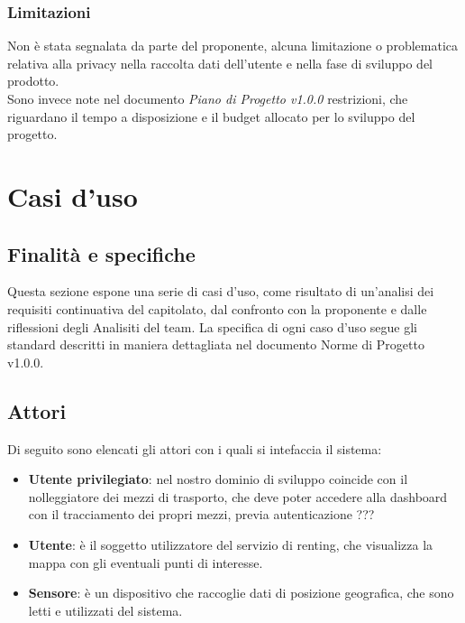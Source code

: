 \documentclass[11pt]{article}
\begin{document}
\begin{justify}
\subsubsection{Limitazioni}
Non è stata segnalata da parte del proponente, alcuna limitazione o problematica relativa alla privacy nella raccolta dati dell'utente e nella fase di sviluppo del prodotto.
\\
Sono invece note nel documento \textit{Piano di Progetto v1.0.0} restrizioni, che riguardano il tempo a disposizione e il budget allocato per lo sviluppo del progetto. 
\newpage
\section{Casi d'uso}
\label{sec:casi-uso}

\subsection{Finalità e specifiche}
Questa sezione espone una serie di casi d'uso, come risultato di un'analisi dei requisiti continuativa del capitolato, dal confronto con la proponente e dalle riflessioni degli Analisiti del team. La specifica di ogni caso d'uso segue gli standard descritti in maniera dettagliata nel documento Norme di Progetto v1.0.0.

\subsection{Attori}
Di seguito sono elencati gli attori con i quali si intefaccia il sistema:
\begin{itemize}
    \item \textbf{Utente privilegiato}: nel nostro dominio di sviluppo coincide con il nolleggiatore dei mezzi di trasporto, che deve poter accedere alla dashboard con il tracciamento dei propri mezzi, previa autenticazione ???
    \item \textbf{Utente}: è il soggetto utilizzatore del servizio di renting, che visualizza la mappa con gli eventuali punti di interesse.
    \item \textbf{Sensore}: è un dispositivo che raccoglie dati di posizione geografica, che sono letti e utilizzati del sistema.
\end{itemize}

\end{justify}
\end{document}
